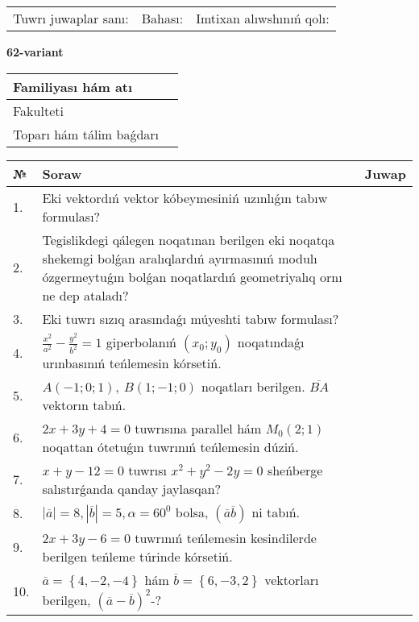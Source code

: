 \documentclass{article}
\begin{document}
\vspace{1cm}

\begin{tabular}{lll}
Tuwrı juwaplar sanı: \underline{\hspace{1.5cm}} & 
Bahası: \underline{\hspace{1.5cm}} & 
Imtixan alıwshınıń qolı: \underline{\hspace{2cm}} \\
\end{tabular}

\egroup

\newpage


\textbf{62-variant}\\

\bgroup
\def\arraystretch{1.6} %

\begin{tabular}{|m{5.7cm}|m{9.5cm}|}
\hline
Familiyası hám atı & \\
\hline
Fakulteti  & \\
\hline
Toparı hám tálim baǵdarı  & \\
\hline
\end{tabular}

\vspace{1cm}

\begin{tabular}{|m{0.7cm}|m{10cm}|m{4cm}|}
\hline
№ & Soraw & Juwap \\
\hline
1. & Eki vektordıń vektor kóbeymesiniń uzınlıǵın tabıw formulası? &  \\
\hline
2. & Tegislikdegi qálegen noqatınan berilgen eki noqatqa shekemgi bolǵan aralıqlardıń ayırmasınıń modulı ózgermeytuǵın bolǵan noqatlardıń geometriyalıq ornı ne dep ataladı? &  \\
\hline
3. & Eki tuwrı sızıq arasındaǵı múyeshti tabıw formulası? &  \\
\hline
4. & $\frac{x^2}{a^2}-\frac{y^2}{b^2}=1$ giperbolanıń $(x_0;y_0)$ noqatındaǵı urınbasınıń teńlemesin kórsetiń. &  \\
\hline
5. & $A (-1;0;1),\ B (1;-1;0)$ noqatları berilgen. $\overline{BA}$ vektorın tabıń. &  \\
\hline
6. & $2x+3y+4=0$ tuwrısına parallel hám $M_{0} (2;1)$ noqattan ótetuǵın tuwrınıń teńlemesin dúziń. &  \\
\hline
7. & $x+y-12=0$ tuwrısı $x^{2}+y^{2}-2y=0$ sheńberge salıstırǵanda qanday jaylasqan? &  \\
\hline
8. & $\left| \overline{a} \right|=8, \left| \overline{b} \right|=5, \alpha=60^{0}$ bolsa, $( \overline{a}\overline{b} )$ ni tabıń. &  \\
\hline
9. & $2x+3y-6=0$ tuwrınıń teńlemesin kesindilerde berilgen teńleme túrinde kórsetiń. &  \\
\hline
10. & $\overline{a}=\left\{ 4,-2,-4 \right\}$ hám $\overline{b}=\left\{ 6,-3, 2 \right\}$ vektorları berilgen, $(\overline{a}-\overline{b}) ^{2}$-? &  \\
\hline
\end{tabular}
\end{document}
